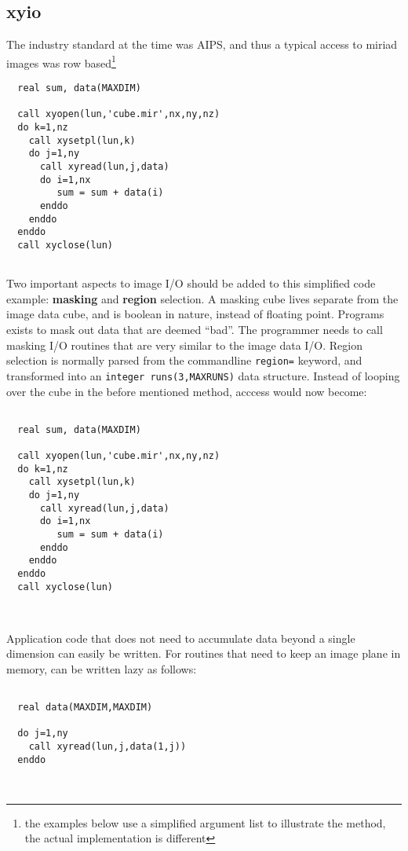 \documentclass[preprint]{aastex} %
\begin{document}
\subsection{xyio}

The industry standard at the time was AIPS, and thus
a typical access to miriad images was 
row based\footnote{the examples below use a simplified
argument list to illustrate the method, the actual 
implementation is different}



\footnotesize
\begin{verbatim}
  real sum, data(MAXDIM)

  call xyopen(lun,'cube.mir',nx,ny,nz)
  do k=1,nz
    call xysetpl(lun,k)
    do j=1,ny
      call xyread(lun,j,data)
      do i=1,nx
         sum = sum + data(i)
      enddo
    enddo
  enddo
  call xyclose(lun)
       
\end{verbatim}
\normalsize

Two important aspects to image I/O should be added to this simplified
code example: {\bf masking} and {\bf region} selection. 
A masking cube lives separate
from the image data cube, and is boolean in nature, instead of floating
point. Programs exists to
mask out data that are deemed ``bad''. The programmer needs to call
masking I/O routines that are very similar to the image data I/O.
Region selection is normally parsed from the commandline {\tt region=}
keyword, and transformed into an {\tt integer runs(3,MAXRUNS)} data
structure. Instead of looping over the cube in the before mentioned
method, acccess would now become:


\footnotesize
\begin{verbatim}

  real sum, data(MAXDIM)

  call xyopen(lun,'cube.mir',nx,ny,nz)
  do k=1,nz
    call xysetpl(lun,k)
    do j=1,ny
      call xyread(lun,j,data)
      do i=1,nx
         sum = sum + data(i)
      enddo
    enddo
  enddo
  call xyclose(lun)
       
       
\end{verbatim}
\normalsize

Application code that does not need to accumulate data beyond a single
dimension can easily be written. For routines that need to keep 
an image plane in memory, can be written lazy as follows:

\footnotesize
\begin{verbatim}

  real data(MAXDIM,MAXDIM)

  do j=1,ny
    call xyread(lun,j,data(1,j))
  enddo
       
       
\end{verbatim}
\normalsize
\end{document}
